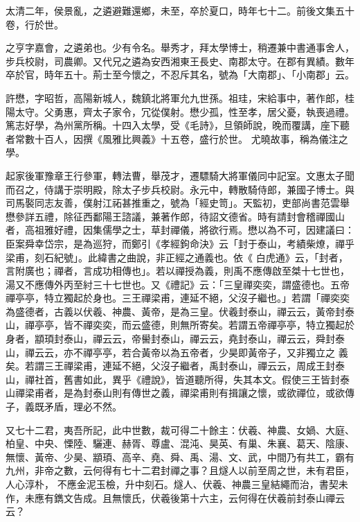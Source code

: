 \begin{pinyinscope}
 太清二年，侯景亂，之遴避難還鄉，未至，卒於夏口，時年七十二。前後文集五十卷，行於世。



 之亨字嘉會，之遴弟也。少有令名。舉秀才，拜太學博士，稍遷兼中書通事舍人，步兵校尉，司農卿。又代兄之遴為安西湘東王長史、南郡太守。在郡有異績。數年卒於官，時年五十。荊士至今懷之，不忍斥其名，號為「大南郡」、「小南郡」云。



 許懋，字昭哲，高陽新城人，魏鎮北將軍允九世孫。祖珪，宋給事中，著作郎，桂陽太守。父勇惠，齊太子家令，冗從僕射。懋少孤，性至孝，居父憂，執喪過禮。篤志好學，為州黨所稱。十四入太學，受《毛詩》，旦領師說，晚而覆講，座下聽者常數十百人，因撰《風雅比興義》十五卷，盛行於世。
 尤曉故事，稱為儀注之學。



 起家後軍豫章王行參軍，轉法曹，舉茂才，遷驃騎大將軍儀同中記室。文惠太子聞而召之，侍講于崇明殿，除太子步兵校尉。永元中，轉散騎侍郎，兼國子博士。與司馬褧同志友善，僕射江祏甚推重之，號為「經史笥」。天監初，吏部尚書范雲舉懋參詳五禮，除征西鄱陽王諮議，兼著作郎，待詔文德省。時有請封會稽禪國山者，高祖雅好禮，因集儒學之士，草封禪儀，將欲行焉。懋以為不可，因建議曰：臣案舜幸岱宗，是為巡狩，而鄭引《孝經鉤命決》云「封于泰山，考績柴燎，禪乎梁甫，刻石紀號」。此緯書之曲說，非正經之通義也。依《
 白虎通》云，「封者，言附廣也；禪者，言成功相傳也」。若以禪授為義，則禹不應傳啟至桀十七世也，湯又不應傳外丙至紂三十七世也。又《禮記》云：「三皇禪奕奕，謂盛德也。五帝禪亭亭，特立獨起於身也。三王禪梁甫，連延不絕，父沒子繼也。」若謂「禪奕奕為盛德者，古義以伏羲、神農、黃帝，是為三皇。伏羲封泰山，禪云云，黃帝封泰山，禪亭亭，皆不禪奕奕，而云盛德，則無所寄矣。若謂五帝禪亭亭，特立獨起於身者，顓頊封泰山，禪云云，帝嚳封泰山，禪云云，堯封泰山，禪云云，舜封泰山，禪云云，亦不禪亭亭，若合黃帝以為五帝者，少昊即黃帝子，又非獨立之
 義矣。若謂三王禪梁甫，連延不絕，父沒子繼者，禹封泰山，禪云云，周成王封泰山，禪社首，舊書如此，異乎《禮說》，皆道聽所得，失其本文。假使三王皆封泰山禪梁甫者，是為封泰山則有傳世之義，禪梁甫則有揖讓之懷，或欲禪位，或欲傳子，義既矛盾，理必不然。



 又七十二君，夷吾所記，此中世數，裁可得二十餘主：伏羲、神農、女媧、大庭、柏皇、中央、慄陸、驪連、赫胥、尊盧、混沌、昊英、有巢、朱襄、葛天、陰康、無懷、黃帝、少昊、顓頊、高辛、堯、舜、禹、湯、文、武，中間乃有共工，霸有九州，非帝之數，云何得有七十二君封禪之事？且燧人以前至周之世，未有君臣，人心淳朴，
 不應金泥玉檢，升中刻石。燧人、伏羲、神農三皇結繩而治，書契未作，未應有鐫文告成。且無懷氏，伏羲後第十六主，云何得在伏羲前封泰山禪云云？




\end{pinyinscope}

